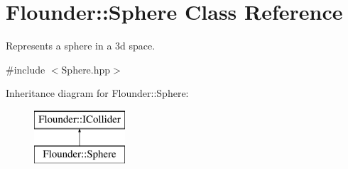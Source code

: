 \hypertarget{class_flounder_1_1_sphere}{}\section{Flounder\+:\+:Sphere Class Reference}
\label{class_flounder_1_1_sphere}


Represents a sphere in a 3d space.  




{\ttfamily \#include $<$Sphere.\+hpp$>$}

Inheritance diagram for Flounder\+:\+:Sphere\+:\begin{figure}[H]
\begin{center}
\leavevmode
\includegraphics[height=2.000000cm]{class_flounder_1_1_sphere}
\end{center}
\end{figure}
